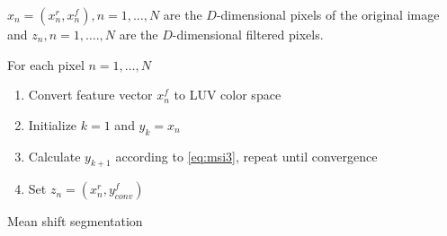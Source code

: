 \begin{algorithm2e}[H]
  $x_n = (x_n^r, x_n^f), n = 1, \ldots , N$ are the $D$-dimensional pixels of the
  original image and $z_n, n = 1 , \ldots. , N$ are the $D$-dimensional filtered pixels.

  For each pixel $n = 1, \ldots , N$
\begin{enumerate}%
	\item Convert feature vector $x_n^f$ to \gls{LUV} color space
    \item Initialize $k = 1$ and $y_k = x_n$
    \item Calculate $y_{k+1}$ according to \autoref{eq:msi3}, repeat until convergence
    \item Set $z_n = (x_n^r, y_{conv}^f)$ 
\end{enumerate}
\label{alg:mss}
\caption{Mean shift segmentation}
\end{algorithm2e}


